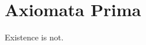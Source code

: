 \section{Axiomata Prima}
\label{sec:bk1_axiomata_prima}
\begin{axiom}
\label{axiom:bk1_axiomata_prima}
Existence is not.
\end{axiom}
